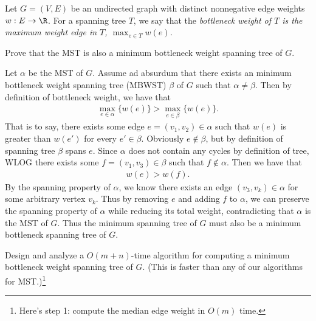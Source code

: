 \documentclass{article}
\begin{document}
 Let \( G=(V,E) \) be an undirected graph with distinct nonnegative edge weights \( w:E\to\R \).
For a spanning tree \( T \), we say that the \it{bottleneck weight of \( T \)} is the maximum weight edge in \( T \), \( \max_{e\in T} w(e) \).
\setcounter{section}{16}
\setcounter{exercise}{6}
\begin{subexercise}
Prove that the MST is also a minimum bottleneck weight spanning tree of \( G \).
\end{subexercise}
\begin{solution}
  Let \( \alpha \) be the MST of \( G \).
  Assume ad absurdum that there exists an minimum bottleneck weight spanning tree (MBWST) \( \beta \) of \( G \) such that \( \alpha \neq \beta \).
  Then by definition of bottleneck weight, we have that \begin{align*}
    \max\limits_{e\in \alpha}\{w(e)\} > \max\limits_{e\in \beta}\{w(e)\}.
  \end{align*}
  That is to say, there exists some edge \( e=(v_1, v_2)\in\alpha \) such that \( w(e) \) is greater than \( w(e') \) for every \( e'\in \beta \).
  Obviously \( e\not\in \beta \), but by definition of spanning tree \( \beta \) spans \( e \).
  Since \( \alpha \) does not contain any cycles by definition of tree, WLOG there exists some \( f=(v_1, v_3) \in \beta \) such that \( f\not\in\alpha \).
  Then we have that \begin{align*}
    w(e) > w(f).
  \end{align*}
  By the spanning property of \( \alpha \), we know there exists an edge \( (v_3,v_k)\in\alpha \) for some arbitrary vertex \( v_k \).
  Thus by removing \( e \) and adding \( f \) to \( \alpha \), we can preserve the spanning property of \( \alpha \) while reducing its total weight, contradicting that \( \alpha \) is the MST of \( G \).
  Thus the minimum spanning tree of \( G \) must also be a minimum bottleneck spanning tree of \( G \).
\end{solution}
\pagebreak

\begin{subexercise}
  Design and analyze a \( O(m + n) \)-time algorithm for computing a minimum
bottleneck weight spanning tree of \( G \).
(This is faster than any of our algorithms for MST.)\footnote[4]{Here's step 1: compute the median edge weight in \( O(m) \) time.}
\end{subexercise}

\begin{solution}

\end{solution}
\pagebreak
\end{document}
